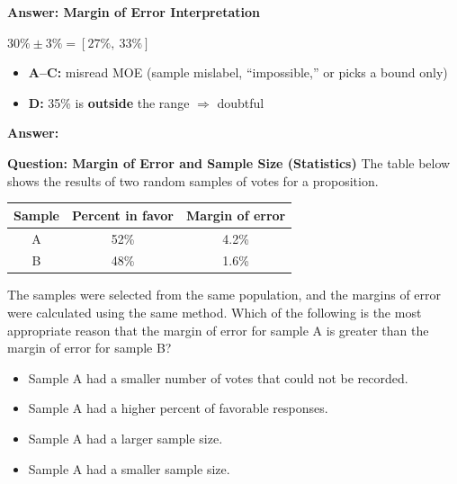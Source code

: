 \documentclass{beamer}
\begin{document}
\begin{frame}{\textbf{Answer: Margin of Error Interpretation}}
\small

$30\% \pm 3\% = [27\%,\ 33\%]$

\vspace{0.1cm}
\begin{itemize}
    \item \textbf{A–C:} misread MOE (sample mislabel, ``impossible,'' or picks a bound only)
    \item \textbf{D:} 35\% is \textbf{outside} the range $\Rightarrow$ doubtful
\end{itemize}

\textbf{Answer:} 

\end{frame}

\begin{frame}{\textbf{Question: Margin of Error and Sample Size (Statistics)}}
\small
The table below shows the results of two random samples of votes for a proposition.

\begin{center}
\renewcommand{\arraystretch}{1.2}
\setlength{\tabcolsep}{12pt}
\begin{tabular}{|c|c|c|}
\hline
\textbf{Sample} & \textbf{Percent in favor} & \textbf{Margin of error} \\
\hline
A & 52\% & 4.2\% \\
B & 48\% & 1.6\% \\
\hline
\end{tabular}
\end{center}

The samples were selected from the same population, and the margins of error were calculated using the same method. Which of the following is the most appropriate reason that the margin of error for sample A is greater than the margin of error for sample B?

\begin{itemize}
    \item[A.] Sample A had a smaller number of votes that could not be recorded.
    \item[B.] Sample A had a higher percent of favorable responses.
    \item[C.] Sample A had a larger sample size.
    \item[D.] Sample A had a smaller sample size.
\end{itemize}
\end{frame}
\end{document}
